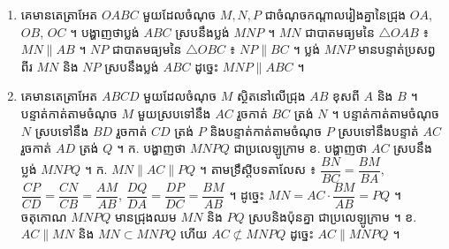 \begin{enumerate}[1]
  \item គេមានតេត្រាអែត $OABC$ មួយដែលចំណុច $M, N, P$ ជាចំណុចកណ្ដាលរៀងគ្នានៃជ្រុង $OA$, $OB$, $OC$ ។ បង្ហាញថាប្លង់ $ABC$ ស្របនឹងប្លង់ $MNP$ ។
  \ans
  $MN$ ជាបាតមធ្យមនៃ $\triangle OAB$ ៖ $MN \parallel AB$ ។ $NP$ ជាបាតមធ្យមនៃ $\triangle OBC$ ៖ $NP \parallel BC$ ។ ប្លង់ $MNP$ មានបន្ទាត់ប្រសព្វពីរ $MN$ និង $NP$ ស្របនឹងប្លង់ $ABC$ ដូច្នេះ $MNP \parallel ABC$ ។
  \item គេមានតេត្រាអែត $ABCD$ មួយដែលចំណុច $M$ ស្ថិតនៅលើជ្រុង $AB$ ខុសពី $A$ និង $B$ ។ បន្ទាត់កាត់តាមចំណុច $M$ មួយស្របទៅនឹង $AC$ រួចកាត់ $BC$ ត្រង់ $N$ ។ បន្ទាត់កាត់តាមចំណុច $N$ ស្របទៅនឹង $BD$ រួចកាត់ $CD$ ត្រង់ $P$ និងបន្ទាត់កាត់តាមចំណុច $P$ ស្របទៅនឹងបន្ទាត់ $AC$ រួចកាត់ $AD$ ត្រង់ $Q$ ។ \quad ក. បង្ហាញថា $MNPQ$ ជាប្រលេឡូក្រាម \quad ខ. បង្ហាញថា $AC$ ស្របនឹងប្លង់ $MNPQ$ ។
  \ans
  ក. $MN \parallel AC \parallel PQ$ ។ តាមទ្រឹស្ដីបទតាលែស ៖ $\dfrac{BN}{BC} = \dfrac{BM}{BA}$, $\dfrac{CP}{CD} = \dfrac{CN}{CB} = \dfrac{AM}{AB}$, $\dfrac{DQ}{DA} = \dfrac{DP}{DC} = \dfrac{BM}{AB}$ ។ ដូច្នេះ $MN = AC\cdot\dfrac{BM}{AB} = PQ$ ។ ចតុកោណ $MNPQ$ មានជ្រុងឈម $MN$ និង $PQ$ ស្របនិងប៉ុនគ្នា ជាប្រលេឡូក្រាម ។ \quad ខ. $AC \parallel MN$ និង $MN \subset MNPQ$ ហើយ $AC \not\subset MNPQ$ ដូច្នេះ $AC \parallel MNPQ$ ។
\end{enumerate}
